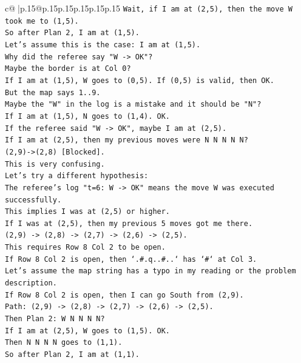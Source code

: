 \documentclass{article}
\begin{document}
{\begin{supertabular}{c@{$\;$}|p{.15\linewidth}@{}p{.15\linewidth}p{.15\linewidth}p{.15\linewidth}p{.15\linewidth}p{.15\linewidth}}
{{{\texttt{Wait, if I am at (2,5), then the move W took me to (1,5).} \\
\texttt{So after Plan 2, I am at (1,5).} \\
\texttt{Let's assume this is the case: I am at (1,5).} \\
\texttt{Why did the referee say "W {-}> OK"?} \\
\texttt{Maybe the border is at Col 0?} \\
\texttt{If I am at (1,5), W goes to (0,5). If (0,5) is valid, then OK.} \\
\texttt{But the map says 1..9.} \\
\texttt{Maybe the "W" in the log is a mistake and it should be "N"?} \\
\texttt{If I am at (1,5), N goes to (1,4). OK.} \\
\texttt{If the referee said "W {-}> OK", maybe I am at (2,5).} \\
\texttt{If I am at (2,5), then my previous moves were N N N N N?} \\
\texttt{(2,9){-}>(2,8) {[}Blocked{]}.} \\
\texttt{This is very confusing.} \\
\texttt{Let's try a different hypothesis:} \\
\texttt{The referee's log "t=6: W {-}> OK" means the move W was executed successfully.} \\
\texttt{This implies I was at (2,5) or higher.} \\
\texttt{If I was at (2,5), then my previous 5 moves got me there.} \\
\texttt{(2,9) {-}> (2,8) {-}> (2,7) {-}> (2,6) {-}> (2,5).} \\
\texttt{This requires Row 8 Col 2 to be open.} \\
\texttt{If Row 8 Col 2 is open, then `.\#.q..\#..` has `\#` at Col 3.} \\
\texttt{Let's assume the map string has a typo in my reading or the problem description.} \\
\texttt{If Row 8 Col 2 is open, then I can go South from (2,9).} \\
\texttt{Path: (2,9) {-}> (2,8) {-}> (2,7) {-}> (2,6) {-}> (2,5).} \\
\texttt{Then Plan 2: W N N N N?} \\
\texttt{If I am at (2,5), W goes to (1,5). OK.} \\
\texttt{Then N N N N goes to (1,1).} \\
\texttt{So after Plan 2, I am at (1,1).} \\
}}}
\end{supertabular}}
\end{document}
